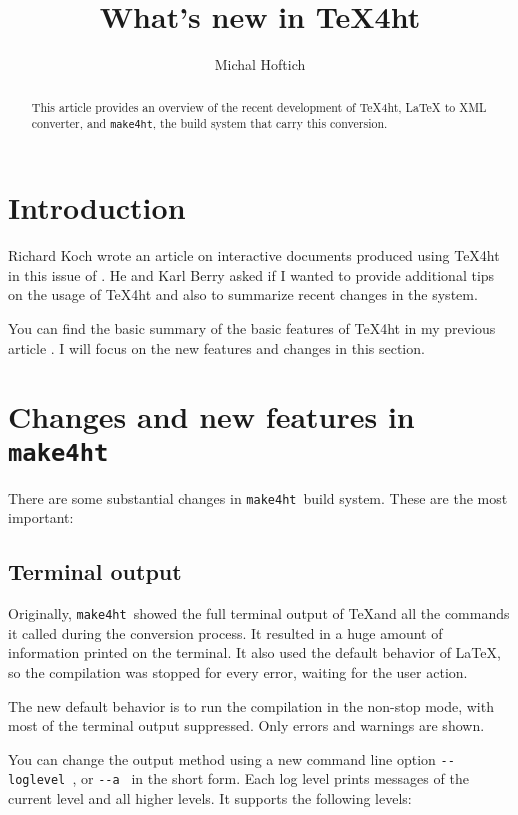 \documentclass{ltugboat}
\title{What's new in \TeX4ht}
\author{Michal Hoftich}
\newcommand\makefourht{\texttt{make4ht}}
\begin{document}
\maketitle

\begin{abstract}
This article provides an overview of the recent development of \TeX4ht, 
\LaTeX{} to XML converter, and \makefourht, the build system that carry this conversion.
\end{abstract}

\section{Introduction}

Richard Koch wrote an article on interactive documents produced using
\TeX4ht in this issue of \TUB. He and Karl Berry asked if I wanted 
to provide additional tips on the usage of \TeX4ht and also to summarize 
recent changes in the system.


You can find the basic summary of the basic features of \TeX4ht in my previous article
\cite{Hoftich:2019:TLW}. I will focus on the new features and changes in this section.

\section{Changes and new features in \makefourht}

There are some substantial changes in \makefourht\ build system. These are the
most important:

\subsection{Terminal output}

Originally, \makefourht\ showed the full terminal output of \TeX and all 
the commands it called during the conversion process. It resulted in a huge 
amount of information printed on the terminal. It also used the default 
behavior of \LaTeX, so the compilation was stopped for every error, waiting
for the user action.

The new default behavior is to run the compilation in the non-stop mode, 
with most of the terminal output suppressed. Only errors and warnings are 
shown. 

You can change the output method using a new command line option
\verb|--loglevel |, or \verb|--a | in the short form. Each log level prints 
messages of the current level and all higher levels.
It supports the following levels:
\end{document}
